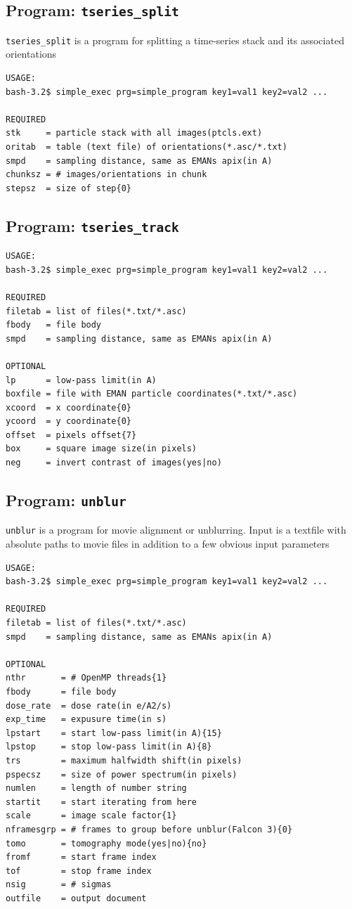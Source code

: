 \documentclass[a4paper,11pt]{article}
\newcommand{\prgname}[1]{\textcolor{NavyBlue}{\texttt{#1}}}
\begin{document}
\subsection{Program: \prgname{tseries\_split}}
\label{tseries_split}
\prgname{tseries\_split} is a program for splitting a time-series stack and its associated orientations 

\begin{verbatim}
USAGE:
bash-3.2$ simple_exec prg=simple_program key1=val1 key2=val2 ...

REQUIRED
stk     = particle stack with all images(ptcls.ext)
oritab  = table (text file) of orientations(*.asc/*.txt)
smpd    = sampling distance, same as EMANs apix(in A)
chunksz = # images/orientations in chunk
stepsz  = size of step{0}
\end{verbatim}

\subsection{Program: \prgname{tseries\_track}}
\label{tseries_track}
\begin{verbatim}
USAGE:
bash-3.2$ simple_exec prg=simple_program key1=val1 key2=val2 ...

REQUIRED
filetab = list of files(*.txt/*.asc)
fbody   = file body
smpd    = sampling distance, same as EMANs apix(in A)

OPTIONAL
lp      = low-pass limit(in A)
boxfile = file with EMAN particle coordinates(*.txt/*.asc)
xcoord  = x coordinate{0}
ycoord  = y coordinate{0}
offset  = pixels offset{7}
box     = square image size(in pixels)
neg     = invert contrast of images(yes|no)
\end{verbatim}

\subsection{Program: \prgname{unblur}}
\label{unblur}
\prgname{unblur} is a program for movie alignment or unblurring. Input is a textfile with absolute paths to movie files in addition to a few obvious input parameters

\begin{verbatim}
USAGE:
bash-3.2$ simple_exec prg=simple_program key1=val1 key2=val2 ...

REQUIRED
filetab = list of files(*.txt/*.asc)
smpd    = sampling distance, same as EMANs apix(in A)

OPTIONAL
nthr       = # OpenMP threads{1}
fbody      = file body
dose_rate  = dose rate(in e/A2/s)
exp_time   = expusure time(in s)
lpstart    = start low-pass limit(in A){15}
lpstop     = stop low-pass limit(in A){8}
trs        = maximum halfwidth shift(in pixels)
pspecsz    = size of power spectrum(in pixels)
numlen     = length of number string
startit    = start iterating from here
scale      = image scale factor{1}
nframesgrp = # frames to group before unblur(Falcon 3){0}
tomo       = tomography mode(yes|no){no}
fromf      = start frame index
tof        = stop frame index
nsig       = # sigmas
outfile    = output document
\end{verbatim}
\end{document}
